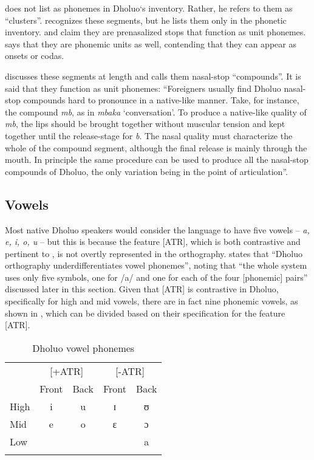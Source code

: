 \documentclass[output=paper,colorlinks,citecolor=brown]{langscibook}
\begin{document}
\begin{sloppypar}
\citet{Gregersen1961} does not list  as phonemes in Dholuo‘s inventory. Rather, he refers to them as “clusters”.
\citet{Onyango2016} recognizes these segments, but he lists them only in the phonetic inventory. \citet{Oduor2002} and \citet{Njuki2016} claim they are prenasalized stops that function as unit phonemes. \citet{Ombijah2020} says that they are phonemic units as well, contending that they can appear as onsets or codas.
\end{sloppypar}

\citet[17]{Okoth-Okombo1997} discusses these segments at length and calls them nasal-stop “compounds”. It is said that they function as unit phonemes: “Foreigners usually find Dholuo nasal-stop compounds hard to pronounce in a native-like manner. Take, for instance, the compound \textit{mb}, as in \textit{mbaka} ‘conversation’. To produce a native-like quality of \textit{mb}, the lips should be brought together without muscular tension and kept together until the release-stage for \textit{b}. The nasal quality must characterize the whole of the compound segment, although the final release is mainly through the mouth. In principle the same procedure can be used to produce all the nasal-stop compounds of Dholuo, the only variation being in the point of articulation”. 


\subsection{Vowels}
Most native Dholuo speakers would consider the language to have five vowels -- \textit{a, e, i, o, u} -- but this is because the feature  [ATR], which is both contrastive and pertinent to , is not overtly represented in the orthography. \citet[18]{Okoth-Okombo1997} states that “Dholuo orthography underdifferentiates vowel phonemes”, noting that “the whole system uses only five symbols, one for /a/ and one for each of the four [phonemic] pairs” discussed later in this section. Given that [ATR] is contrastive in Dholuo, specifically for high and mid vowels, there are in fact nine phonemic vowels, as shown in , which can be divided based on their specification for the feature [ATR].

\begin{table}
\caption{Dholuo vowel phonemes}
\label{tab:VPhonemes}
 \begin{tabular}{lcccc}
  \lsptoprule
& \multicolumn{2}{c}{[+ATR]} & \multicolumn{2}{c}{[-ATR]}  \\
& Front & Back & Front & Back \\
\midrule
High & i & u & ɪ & ʊ \\
Mid & e & o & ɛ & ɔ \\
Low &&  & & a\\
  \lspbottomrule
 \end{tabular}
\end{table}   
\end{document}
